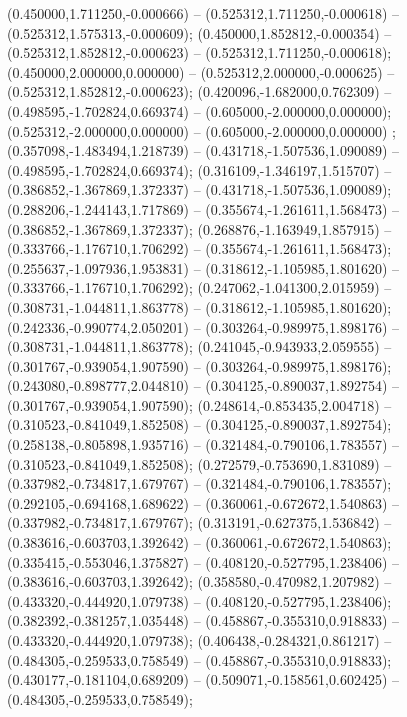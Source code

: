  (0.450000,1.711250,-0.000666) -- (0.525312,1.711250,-0.000618) -- (0.525312,1.575313,-0.000609);
 (0.450000,1.852812,-0.000354) -- (0.525312,1.852812,-0.000623) -- (0.525312,1.711250,-0.000618);
 (0.450000,2.000000,0.000000) -- (0.525312,2.000000,-0.000625) -- (0.525312,1.852812,-0.000623);
 (0.420096,-1.682000,0.762309) -- (0.498595,-1.702824,0.669374) -- (0.605000,-2.000000,0.000000);
 (0.525312,-2.000000,0.000000) -- (0.605000,-2.000000,0.000000) ;
 (0.357098,-1.483494,1.218739) -- (0.431718,-1.507536,1.090089) -- (0.498595,-1.702824,0.669374);
 (0.316109,-1.346197,1.515707) -- (0.386852,-1.367869,1.372337) -- (0.431718,-1.507536,1.090089);
 (0.288206,-1.244143,1.717869) -- (0.355674,-1.261611,1.568473) -- (0.386852,-1.367869,1.372337);
 (0.268876,-1.163949,1.857915) -- (0.333766,-1.176710,1.706292) -- (0.355674,-1.261611,1.568473);
 (0.255637,-1.097936,1.953831) -- (0.318612,-1.105985,1.801620) -- (0.333766,-1.176710,1.706292);
 (0.247062,-1.041300,2.015959) -- (0.308731,-1.044811,1.863778) -- (0.318612,-1.105985,1.801620);
 (0.242336,-0.990774,2.050201) -- (0.303264,-0.989975,1.898176) -- (0.308731,-1.044811,1.863778);
 (0.241045,-0.943933,2.059555) -- (0.301767,-0.939054,1.907590) -- (0.303264,-0.989975,1.898176);
 (0.243080,-0.898777,2.044810) -- (0.304125,-0.890037,1.892754) -- (0.301767,-0.939054,1.907590);
 (0.248614,-0.853435,2.004718) -- (0.310523,-0.841049,1.852508) -- (0.304125,-0.890037,1.892754);
 (0.258138,-0.805898,1.935716) -- (0.321484,-0.790106,1.783557) -- (0.310523,-0.841049,1.852508);
 (0.272579,-0.753690,1.831089) -- (0.337982,-0.734817,1.679767) -- (0.321484,-0.790106,1.783557);
 (0.292105,-0.694168,1.689622) -- (0.360061,-0.672672,1.540863) -- (0.337982,-0.734817,1.679767);
 (0.313191,-0.627375,1.536842) -- (0.383616,-0.603703,1.392642) -- (0.360061,-0.672672,1.540863);
 (0.335415,-0.553046,1.375827) -- (0.408120,-0.527795,1.238406) -- (0.383616,-0.603703,1.392642);
 (0.358580,-0.470982,1.207982) -- (0.433320,-0.444920,1.079738) -- (0.408120,-0.527795,1.238406);
 (0.382392,-0.381257,1.035448) -- (0.458867,-0.355310,0.918833) -- (0.433320,-0.444920,1.079738);
 (0.406438,-0.284321,0.861217) -- (0.484305,-0.259533,0.758549) -- (0.458867,-0.355310,0.918833);
 (0.430177,-0.181104,0.689209) -- (0.509071,-0.158561,0.602425) -- (0.484305,-0.259533,0.758549);
